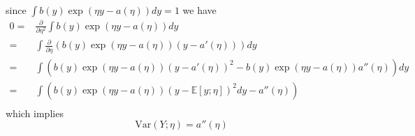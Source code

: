 \begin{answer}
since $ \int b(y)\exp(\eta y -a(\eta))dy =1$
we have
\begin{align*}
	0 = &\frac{\partial }{\partial \eta^2}\int b(y)\exp(\eta y -a(\eta))dy \\
	  = &\int \frac{\partial }{\partial \eta}\left( b(y)\exp(\eta y -a(\eta))(y-a'(\eta))\right) dy \\
	  = &\int \left( b(y)\exp(\eta y -a(\eta))(y-a'(\eta))^2-b(y)\exp(\eta y -a(\eta))a''(\eta)\right) dy\\
	  = &\int \left( b(y)\exp(\eta y -a(\eta))(y-\mathbb{E}[y;\eta])^2dy-a''(\eta)\right) \\
\end{align*}
which implies
\[ \mbox{Var}(Y;\eta)=a''(\eta) \]
\end{answer}
